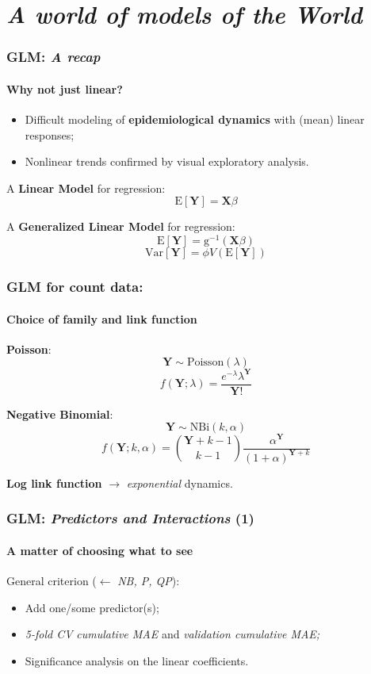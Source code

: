 \documentclass{beamer}
\begin{document}
\section{\textit{A world of models of the World}}{
\begin{frame}
	\frametitle{GLM: \textit{A recap}}
	\framesubtitle{Why not just linear?}

		\begin{itemize}
		\item{Difficult modeling of \textbf{epidemiological dynamics} with (mean) linear responses;}
		\item{Nonlinear trends confirmed by visual exploratory analysis.}
		\end{itemize}
		\hfill

		\pause \center A \textbf{Linear Model} for regression: $$\text{E}[\textbf{Y}] = \textbf{X} \beta$$

		\hfill

		\pause A \textbf{Generalized Linear Model} for regression: $$\text{E}[\textbf{Y}] = \text{g}^{-1}(\textbf{X} \beta)$$
		$$ \text{Var}[\textbf{Y}] = \phi V(\text{E}[\textbf{Y}])$$
\end{frame}

\begin{frame}
	\frametitle{GLM for count data:}
	\framesubtitle{Choice of family and link function}

	\textbf{Poisson}: $$\textbf{Y} \sim \text{Poisson}(\lambda)$$
				  $$f(\textbf{Y};\lambda)=\frac{e^{-\lambda}\lambda^{\textbf{Y}}}{\textbf{Y}!}$$

	\hfill

	\textbf{Negative Binomial}: $$\textbf{Y} \sim \text{NBi}(k,\alpha)$$
				  $$f(\textbf{Y};k,\alpha)=\binom{\textbf{Y}+k-1}{k-1} \frac{\alpha^{\textbf{Y}}}{(1+\alpha)^{\textbf{Y}+k}}$$

	\hfill

	\pause \textbf{Log link function} $\rightarrow$ \textit{exponential} dynamics.


\end{frame}


\begin{frame}
	\frametitle{GLM: \textit{Predictors and Interactions} (1)}
	\framesubtitle{A matter of choosing \textbf{what} to see}

	General criterion ($\leftarrow$ \textit{NB, P, QP}):
	\begin{itemize}
		\item{Add one/some predictor(s);}
		\item{\textit{5-fold CV} \textit{cumulative MAE}} and \textit{validation cumulative MAE;}
		\item{Significance analysis on the linear coefficients.}
	\end{itemize}


\end{frame}}
\end{document}
